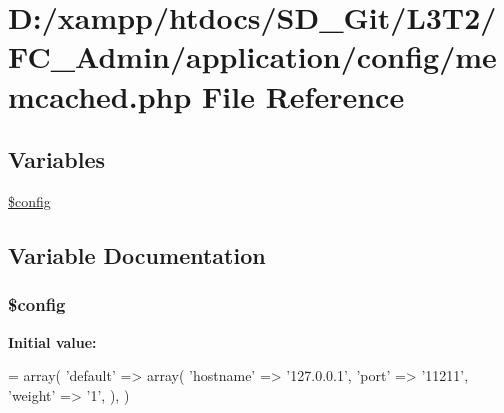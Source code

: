 \hypertarget{_admin_2application_2config_2memcached_8php}{}\section{D\+:/xampp/htdocs/\+S\+D\+\_\+\+Git/\+L3\+T2/\+F\+C\+\_\+\+Admin/application/config/memcached.php File Reference}
\label{_admin_2application_2config_2memcached_8php}
\subsection*{Variables}
\begin{DoxyCompactItemize}
\item 
\hyperlink{_admin_2application_2config_2memcached_8php_a49c7011be9c979d9174c52a8b83e5d8e}{\$config}
\end{DoxyCompactItemize}


\subsection{Variable Documentation}
\hypertarget{_admin_2application_2config_2memcached_8php_a49c7011be9c979d9174c52a8b83e5d8e}{}
\subsubsection[{\$config}]{\setlength{\rightskip}{0pt plus 5cm}\$config}\label{_admin_2application_2config_2memcached_8php_a49c7011be9c979d9174c52a8b83e5d8e}
{\bfseries Initial value\+:}
\begin{DoxyCode}
= array(
    \textcolor{stringliteral}{'default'} => array(
        \textcolor{stringliteral}{'hostname'} => \textcolor{stringliteral}{'127.0.0.1'},
        \textcolor{stringliteral}{'port'}     => \textcolor{stringliteral}{'11211'},
        \textcolor{stringliteral}{'weight'}   => \textcolor{charliteral}{'1'},
    ),
)
\end{DoxyCode}
